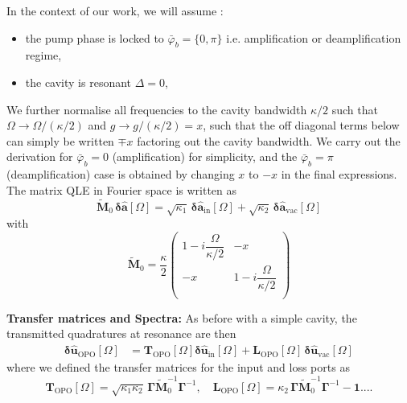 In the context of our work, we will assume : 
\begin{itemize}
  \item the pump phase is locked to $\bar{\varphi}_b = \{0,\pi\}$ i.e. amplification or deamplification regime,  
  \item the cavity is resonant $\Delta=0$,
\end{itemize}
We further normalise all frequencies to the cavity bandwidth $\kappa/2$ such that $\Omega \rightarrow \Omega/(\kappa/2)$ and $g \rightarrow g/(\kappa/2) = x$, such that the off diagonal terms below can simply be written $\mp x$ factoring out the cavity bandwidth. We carry out the derivation for $\bar \varphi_b = 0$ (amplification) for simplicity, and the $\bar \varphi_b = \pi$ (deamplification) case is obtained by changing $x$ to $-x$ in the final expressions. The matrix QLE in Fourier space is written as
\begin{equation}
     \tilde{\mathbf{M}}_0 \,  \mathbf{\delta \hat{a}}[\Omega]  = \sqrt{\kappa_{\mathrm{1}}} \, \mathbf{\delta \hat{a}_{\mathrm{in}}}[\Omega]  + \sqrt{\kappa_2} \, \mathbf{\delta \hat{a}_{\mathrm{vac}}}[\Omega]  
\end{equation}
with 
\begin{equation*}
  \tilde{\mathbf{M}}_0 = \frac{\kappa}{2}\begin{pmatrix}
  1-i\dfrac{\Omega}{\kappa/2} & - x\\ 
  - x  & 1-i\dfrac{\Omega}{\kappa/2}\\ 
  \end{pmatrix} 
\end{equation*}

\noindent \textbf{Transfer matrices and Spectra: }
As before with a simple cavity, the transmitted quadratures at resonance are then 
\begin{equation}
\begin{split}
  \mathbf{\delta \hat{u}_{\mathrm{OPO}}}[\Omega] & =  \mathbf{T}_{\mathrm{OPO}}[\Omega] \mathbf{\delta \hat{u}_{\mathrm{in}}}[\Omega] +  \mathbf{L}_{\mathrm{OPO}}[\Omega] \, \mathbf{\delta \hat{u}_{\mathrm{vac}}}[\Omega] 
\end{split}
\end{equation}
where we defined the transfer matrices for the input and loss ports as
\begin{equation*}
  \mathbf{T}_{\mathrm{OPO}}[\Omega]=  \sqrt{\kappa_1 \kappa_2 } \,\mathbf{\Gamma}  \tilde{\mathbf{M}}^{-1}_0 \mathbf{\Gamma}^{-1}, \quad \mathbf{L}_{\mathrm{OPO}}[\Omega]=  \kappa_2 \,\mathbf{\Gamma}  \tilde{\mathbf{M}}^{-1}_0 \mathbf{\Gamma}^{-1}- \mathbf{1}....
\end{equation*}


